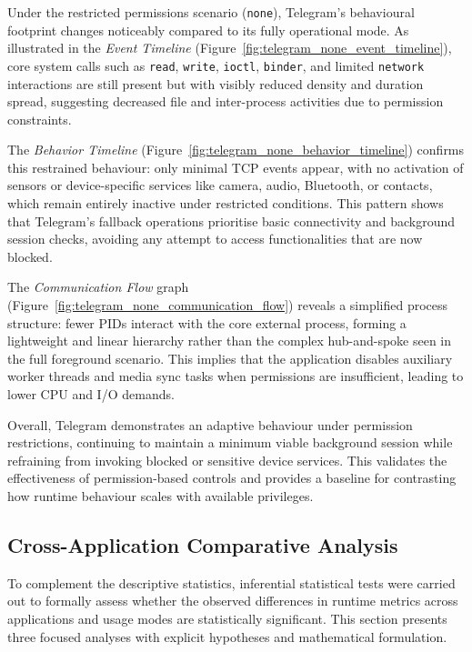 \documentclass[a4paper,12pt]{report}
\begin{document}
Under the restricted permissions scenario (\texttt{none}), Telegram’s behavioural footprint changes noticeably compared to its fully operational mode. As illustrated in the \textit{Event Timeline} (Figure~\ref{fig:telegram_none_event_timeline}), core system calls such as \texttt{read}, \texttt{write}, \texttt{ioctl}, \texttt{binder}, and limited \texttt{network} interactions are still present but with visibly reduced density and duration spread, suggesting decreased file and inter-process activities due to permission constraints.

The \textit{Behavior Timeline} (Figure~\ref{fig:telegram_none_behavior_timeline}) confirms this restrained behaviour: only minimal TCP events appear, with no activation of sensors or device-specific services like camera, audio, Bluetooth, or contacts, which remain entirely inactive under restricted conditions. This pattern shows that Telegram's fallback operations prioritise basic connectivity and background session checks, avoiding any attempt to access functionalities that are now blocked.

The \textit{Communication Flow} graph (Figure~\ref{fig:telegram_none_communication_flow}) reveals a simplified process structure: fewer PIDs interact with the core external process, forming a lightweight and linear hierarchy rather than the complex hub-and-spoke seen in the full foreground scenario. This implies that the application disables auxiliary worker threads and media sync tasks when permissions are insufficient, leading to lower CPU and I/O demands.

Overall, Telegram demonstrates an adaptive behaviour under permission restrictions, continuing to maintain a minimum viable background session while refraining from invoking blocked or sensitive device services. This validates the effectiveness of permission-based controls and provides a baseline for contrasting how runtime behaviour scales with available privileges.

\subsection{Cross-Application Comparative Analysis}
To complement the descriptive statistics, inferential statistical tests were carried out to formally assess whether the observed differences in runtime metrics across applications and usage modes are statistically significant. This section presents three focused analyses with explicit hypotheses and mathematical formulation.
\end{document}

